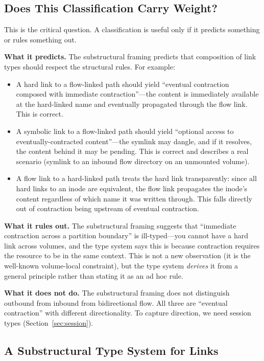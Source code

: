 \documentclass[11pt]{article}
\begin{document}
\subsection{Does This Classification Carry Weight?}

This is the critical question. A classification is useful only if it predicts
something or rules something out.

\textbf{What it predicts.} The substructural framing predicts that composition
of link types should respect the structural rules. For example:
\begin{itemize}
  \item A hard link to a flow-linked path should yield ``eventual contraction
    composed with immediate contraction''---the content is immediately available
    at the hard-linked name and eventually propagated through the flow
    link. This is correct.
  \item A symbolic link to a flow-linked path should yield ``optional access to
    eventually-contracted content''---the symlink may dangle, and if it
    resolves, the content behind it may be pending. This is correct and
    describes a real scenario (symlink to an inbound flow directory on an
    unmounted volume).
  \item A flow link to a hard-linked path treats the hard link transparently:
    since all hard links to an inode are equivalent, the flow link propagates
    the inode's content regardless of which name it was written through. This
    falls directly out of contraction being upstream of eventual contraction.
\end{itemize}

\textbf{What it rules out.} The substructural framing suggests that
``immediate contraction across a partition boundary'' is ill-typed---you cannot
have a hard link across volumes, and the type system says this is because
contraction requires the resource to be in the same context. This is not a new
observation (it is the well-known volume-local constraint), but the type system
\emph{derives} it from a general principle rather than stating it as an ad hoc
rule.

\textbf{What it does not do.} The substructural framing does not distinguish
outbound from inbound from bidirectional flow. All three are ``eventual
contraction'' with different directionality. To capture direction, we need
session types (Section~\ref{sec:session}).

\subsection{A Substructural Type System for Links}
\end{document}

